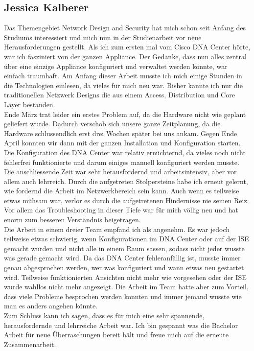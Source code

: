 \subsection{Jessica Kalberer}
Das Themengebiet Network Design and Security hat mich schon seit Anfang des Studiums interessiert und mich nun in der Studienarbeit vor neue Herausforderungen gestellt. Als ich zum ersten mal vom Cisco DNA Center hörte, war ich fasziniert von der ganzen Appliance. Der Gedanke, dass nun alles zentral über eine einzige Appliance konfiguriert und verwaltet werden könnte, war einfach traumhaft. Am Anfang dieser Arbeit musste ich mich einige Stunden in die Technologien einlesen, da vieles für mich neu war. Bisher kannte ich nur die traditionellen Netzwerk Designs die aus einem Access, Distribution und Core Layer bestanden.\\ 
Ende März trat leider ein erstes Problem auf, da die Hardware nicht wie geplant geliefert wurde. Dadurch verschob sich unsere ganze Zeitplanung, da die Hardware schlussendlich erst drei Wochen später bei uns ankam. Gegen Ende April konnten wir dann mit der ganzen Installation und Konfiguration starten. Die Konfiguration des DNA Center war relativ ernüchternd, da vieles noch nicht fehlerfrei funktionierte und darum einiges manuell konfiguriert werden musste. Die anschliessende Zeit war sehr herausfordernd und arbeitsintensiv, aber vor allem auch lehrreich. Durch die aufgetreten Stolpersteine habe ich erneut gelernt, wie fordernd die Arbeit im Netzwerkbereich sein kann. Auch wenn es teilweise etwas mühsam war, verlor es durch die aufgetretenen Hindernisse nie seinen Reiz. Vor allem das Troubleshooting in dieser Tiefe war für mich völlig neu und hat enorm zum besseren Verständnis beigetragen. \\
Die Arbeit in einem dreier Team empfand ich als angenehm. Es war jedoch teilweise etwas schwierig, wenn Konfigurationen im DNA Center oder auf der ISE gemacht wurden und nicht alle in einem Raum sassen, sodass nicht jeder wusste was gerade gemacht wird. Da das DNA Center fehleranfällig ist, musste immer genau abgesprochen werden, wer was konfiguriert und wann etwas neu gestartet wird. Teilweise funktionierten Ansichten nicht mehr wie vorgesehen oder der ISE wurde wahllos nicht mehr angezeigt. Die Arbeit im Team hatte aber zum Vorteil, dass viele Probleme besprochen werden konnten und immer jemand wusste wie man es anders angehen könnte. 
\\
Zum Schluss kann ich sagen, dass es für mich eine sehr spannende, herausfordernde und lehrreiche Arbeit war. Ich bin gespannt was die Bachelor Arbeit für neue Überraschungen bereit hält und freue mich auf die erneute Zusammenarbeit.